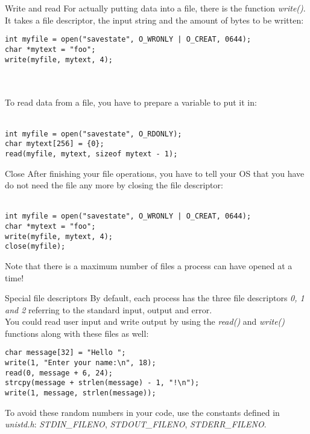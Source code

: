 \begin{frame}[fragile]{Write and read}
	For actually putting data into a file, there is the function \textit{write()}.\\
	It takes a file descriptor, the input string and the amount of bytes to be written:\bigskip
	
	\begin{lstlisting}
int myfile = open("savestate", O_WRONLY | O_CREAT, 0644);
char *mytext = "foo";
write(myfile, mytext, 4);
\end{lstlisting}\ \\\ \\

	To read data from a file, you have to prepare a variable to put it in:\\\ \\
	
	\begin{lstlisting}
int myfile = open("savestate", O_RDONLY);
char mytext[256] = {0};
read(myfile, mytext, sizeof mytext - 1);
\end{lstlisting}
	
\end{frame}

\begin{frame}[fragile]{Close}
	After finishing your file operations, you have to tell your OS that you have do not need the file any more by closing the file descriptor:\\\ \\
	
	\begin{lstlisting}
int myfile = open("savestate", O_WRONLY | O_CREAT, 0644);
char *mytext = "foo";
write(myfile, mytext, 4);
close(myfile);
\end{lstlisting}\bigskip
	Note that there is a maximum number of files a process can have opened at a time!
\end{frame}

\begin{frame}[fragile]{Special file descriptors}
	By default, each process has the three file descriptors \textit{0, 1 and 2} referring to the standard input, output and error.\\
	You could read user input and write output by using the \textit{read()} and \textit{write()} functions along with these files as well:\bigskip
	\begin{lstlisting}
char message[32] = "Hello ";
write(1, "Enter your name:\n", 18);
read(0, message + 6, 24);
strcpy(message + strlen(message) - 1, "!\n");
write(1, message, strlen(message));
\end{lstlisting}\bigskip
	
	To avoid these random numbers in your code, use the constants defined in \textit{unistd.h}: \textit{STDIN\_FILENO}, \textit{STDOUT\_FILENO}, \textit{STDERR\_FILENO}.

\end{frame}

